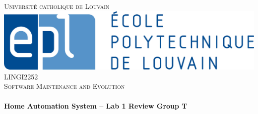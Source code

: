     \begin{titlepage}
        \center %


        \textsc{\LARGE Université catholique de Louvain }\\[1.5cm] %
        \includegraphics[scale=0.45]{epl.jpg}
         \\[0.5cm]
        \textsc{\Large LINGI2252}\\[0.5cm] %
        \textsc{\large Software Maintenance and Evolution}\\[0.5cm] %


        \HRule \\[0.4cm]
        { \huge \bfseries Home Automation System -- Lab 1 Review Group T}\\[0.4cm] %
        \HRule \\[1.5cm]



\end{titlepage}
